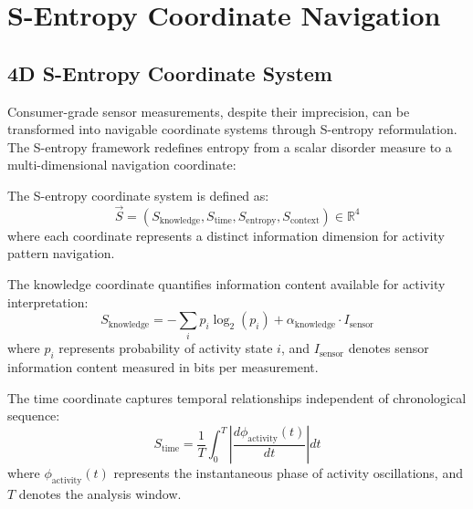 \section{S-Entropy Coordinate Navigation}

\subsection{4D S-Entropy Coordinate System}

Consumer-grade sensor measurements, despite their imprecision, can be transformed into navigable coordinate systems through S-entropy reformulation. The S-entropy framework redefines entropy from a scalar disorder measure to a multi-dimensional navigation coordinate:

\begin{definition}
The S-entropy coordinate system is defined as:
\begin{equation}
\vec{S} = (S_{\text{knowledge}}, S_{\text{time}}, S_{\text{entropy}}, S_{\text{context}}) \in \mathbb{R}^4
\label{eq:s_entropy_coords}
\end{equation}
where each coordinate represents a distinct information dimension for activity pattern navigation.
\end{definition}

\begin{definition}
The knowledge coordinate quantifies information content available for activity interpretation:
\begin{equation}
S_{\text{knowledge}} = -\sum_{i} p_i \log_2(p_i) + \alpha_{\text{knowledge}} \cdot I_{\text{sensor}}
\end{equation}
where $p_i$ represents probability of activity state $i$, and $I_{\text{sensor}}$ denotes sensor information content measured in bits per measurement.
\end{definition}

\begin{definition}
The time coordinate captures temporal relationships independent of chronological sequence:
\begin{equation}
S_{\text{time}} = \frac{1}{T} \int_0^T \left| \frac{d\phi_{\text{activity}}(t)}{dt} \right| dt
\end{equation}
where $\phi_{\text{activity}}(t)$ represents the instantaneous phase of activity oscillations, and $T$ denotes the analysis window.
\end{definition}

